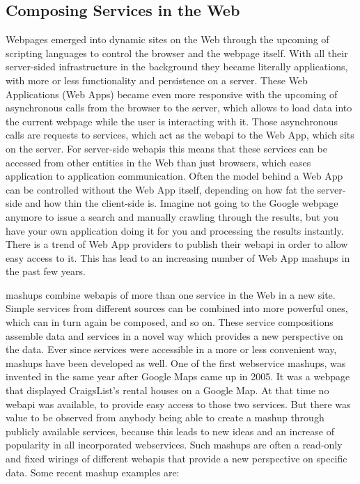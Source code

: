 \subsection{Composing Services in the Web}
Webpages emerged into dynamic sites on the Web through the upcoming of scripting languages to control the browser and the webpage itself.
With all their server-sided infrastructure in the background they became literally applications, with more or less functionality and persistence on a server.
These \textrm{Web Applications (Web Apps)} became even more responsive with the upcoming of asynchronous calls from the browser to the server, which allows to load data into the current webpage while the user is interacting with it.
Those asynchronous calls are requests to services, which act as the \textrm{\gls{webapi}} to the \textrm{Web App}, which sits on the server.
For server-side \textrm{\gls{webapi}s} this means that these services can be accessed from other entities in the Web than just browsers, which eases application to application communication.
Often the model behind a \textrm{Web App} can be controlled without the \textrm{Web App} itself, depending on how fat the server-side and how thin the client-side is.
Imagine not going to the Google webpage anymore to issue a search and manually crawling through the results, but you have your own application doing it for you and processing the results instantly.
There is a trend of \textrm{Web App} providers to publish their \textrm{\gls{webapi}} in order to allow easy access to it.
This has lead to an increasing number of \textrm{Web App \glspl{mashup}} in the past few years.

\textrm{\glspl{mashup}} combine \textrm{\glspl{webapi}} of more than one service in the Web in a new site.
Simple services from different sources can be combined into more powerful ones, which can in turn again be composed, and so on.
These service compositions assemble data and services in a novel way which provides a new perspective on the data.
Ever since services were accessible in a more or less convenient way, \textrm{\glspl{mashup}} have been developed as well.
One of the first \textrm{\gls{webservice} \glspl{mashup}}\cite{wwwHosuingMaps}, was invented in the same year after Google Maps came up in 2005.
It was a webpage that displayed CraigsList's rental houses on a Google Map.
At that time no \textrm{\gls{webapi}} was available, to provide easy access to those two services.
But there was value to be observed from anybody being able to create a \textrm{\gls{mashup}} through publicly available services, because this leads to new ideas and an increase of popularity in all incorporated \textrm{\glspl{webservice}}.
Such \textrm{\glspl{mashup}} are often a read-only and fixed wirings of different \textrm{\glspl{webapi}} that provide a new perspective on specific data.
Some recent \textrm{\gls{mashup}} examples are:

